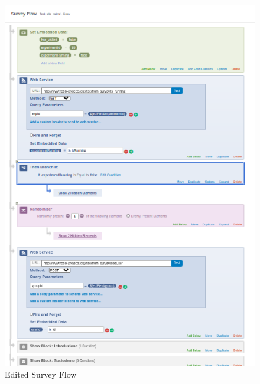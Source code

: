 \documentclass[fleqn]{article}
\begin{document}
\begin{figure} [h]
\centering
\includegraphics[width=\textwidth]{img/qflow}
\caption{Edited Survey Flow}
\label{fig:qflow}
\end{figure}
\end{document}
